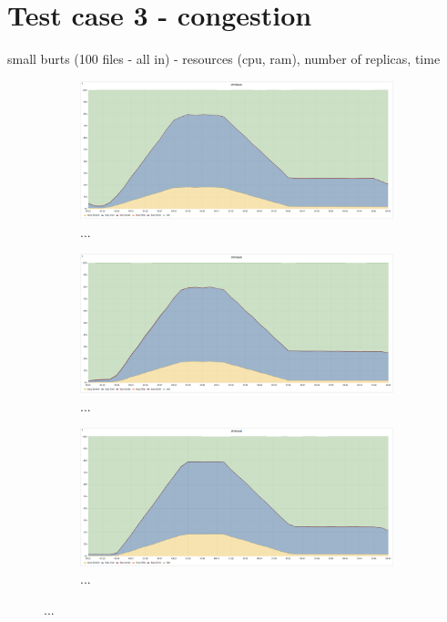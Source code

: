 \section{Test case 3 - congestion}
small burts (100 files - all in) - resources (cpu, ram), number of replicas, time

\begin{figure}[H]
    \begin{subfigure}[h]{0.5\linewidth}
        \centering
        \includegraphics[width=1\linewidth]{other-fig/tests/overload_cpu1.png}
        \caption{...}
    \end{subfigure}
    \hfill
    \begin{subfigure}[h]{0.5\linewidth}
        \centering
        \includegraphics[width=1\linewidth]{other-fig/tests/overload_cpu2.png}
        \caption{...}
    \end{subfigure}
    \begin{subfigure}[h]{1\linewidth}
        \centering
        \includegraphics[width=0.5\linewidth]{other-fig/tests/overload_cpu3.png}
        \caption{...}
    \end{subfigure}
    \caption{...}
\end{figure}

